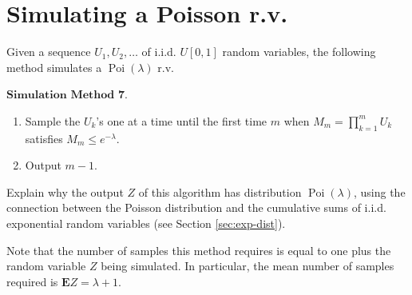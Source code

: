 \section{Simulating a Poisson r.v.}

Given a sequence $U_1,U_2,\ldots$ of i.i.d. $U[0,1]$
random variables, the following method simulates a
$\operatorname{Poi}(\lambda)$ r.v.

$\textbf{Simulation Method 7.}$

\begin{enumerate}[label=\arabic*.]
\item Sample the $U_k$'s one at a time until the first time
$m$ when $M_m =\prod_{k=1}^m U_k$ satisfies
$M_m \le e^{-\lambda}$.

\item Output $m-1$.
\end{enumerate}

\begin{xexercise}
Explain why the output $Z$ of this algorithm has
distribution $\operatorname{Poi}(\lambda)$, using the
connection between the Poisson distribution and the
cumulative sums of i.i.d. exponential random variables
(see Section \ref{sec:exp-dist}).
\end{xexercise}

\noindent Note that the number of samples this method requires
is equal to one plus the random variable $Z$ being
simulated. In particular, the mean number of samples
required is $\mathbf{E} Z = \lambda+1$.
